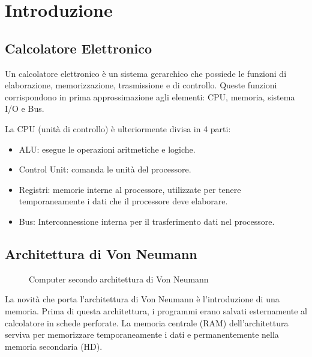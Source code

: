 \documentclass[../ace.tex]{subfiles}
\begin{document}
\section{Introduzione}
\subsection{Calcolatore Elettronico}
Un calcolatore elettronico è un sistema gerarchico che possiede le funzioni di elaborazione,
memorizzazione, trasmissione e di controllo.  Queste funzioni corrispondono in prima
approssimazione agli elementi: CPU, memoria, sistema I/O e Bus.

La CPU (unità di controllo) è ulteriormente divisa in 4 parti:
\begin{itemize}
    \item ALU: esegue le operazioni aritmetiche e logiche.
    \item Control Unit: comanda le unità del processore.
    \item Registri: memorie interne al processore, utilizzate per tenere temporaneamente i
        dati che il processore deve elaborare.
    \item Bus: Interconnessione interna per il trasferimento dati nel processore.
\end{itemize}

\subsection{Architettura di Von Neumann}
\begin{figure}[h]
    \centering

    \caption{Computer secondo architettura di Von Neumann}
    \label{img:von_neumann}
\end{figure}

\noindent La novità che porta l'architettura di Von Neumann è l'introduzione di una memoria.
Prima di questa architettura, i programmi erano salvati esternamente al calcolatore in schede perforate.
La memoria centrale (RAM) dell'architettura serviva per memorizzare temporaneamente i dati e permanentemente
nella memoria secondaria (HD).
\end{document}
